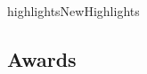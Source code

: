 \documentclass{ra2018}
\begin{document}

\begin{module}{highlights}{NewHighlights}{}

\subsection{Awards}


\end{module}

\end{document}
